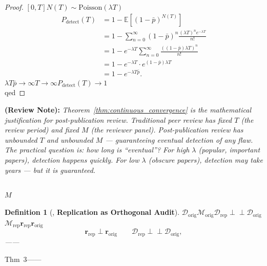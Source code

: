 \documentclass[12pt,a4paper]{article}
\newtheorem{definition}[theorem]{Definition}
\theoremstyle{remark}
\newcommand{\E}{\mathbb{E}}
\newcommand{\D}{\mathcal{D}}
\newcommand{\indep}{\perp\!\!\!\perp}
\newcommand{\reviewVec}{\mathbf{r}}
\newcommand{\detectProb}{P_{\text{detect}}}
\newcommand{\reviewnote}[1]{%
    \medskip\noindent
    \textbf{ (Review Note):} \textit{#1}%
}
\begin{document}
\begin{proof}
$[0, T]$$N(T) \sim \text{Poisson}(\lambda T)$
\begin{align}
    \detectProb(T) &= 1 - \E\left[(1-\bar{p})^{N(T)}\right] \\
    &= 1 - \sum_{n=0}^{\infty} (1-\bar{p})^n \frac{(\lambda T)^n e^{-\lambda T}}{n!} \\
    &= 1 - e^{-\lambda T} \sum_{n=0}^{\infty} \frac{((1-\bar{p})\lambda T)^n}{n!} \\
    &= 1 - e^{-\lambda T} \cdot e^{(1-\bar{p})\lambda T} \\
    &= 1 - e^{-\lambda T \bar{p}}.
\end{align}
$\lambda T \bar{p} \to \infty$$T \to \infty$$\detectProb(T) \to 1$\\qed
\end{proof}

\reviewnote{Theorem~\ref{thm:continuous_convergence} is the mathematical justification for post-publication review. Traditional peer review has fixed $T$ (the review period) and fixed $M$ (the reviewer panel). Post-publication review has unbounded $T$ and unbounded $M$ — guaranteeing eventual detection of any flaw. The practical question is: how long is ``eventual''? For high $\lambda$ (popular, important papers), detection happens quickly. For low $\lambda$ (obscure papers), detection may take years — but it is guaranteed.}

\subsection{}

$M$\textbf{}

\begin{definition}[, \textbf{Replication as Orthogonal Audit}]
\label{def:replication_orthogonal}
$\D_{\text{orig}}$$\mathcal{M}_{\text{orig}}$$\D_{\text{rep}} \indep \D_{\text{orig}}$$\mathcal{M}_{\text{rep}}$$\reviewVec_{\text{rep}}$$\reviewVec_{\text{orig}}$
\begin{equation}
    \reviewVec_{\text{rep}} \perp \reviewVec_{\text{orig}} \quad \text{} \quad \D_{\text{rep}} \indep \D_{\text{orig}},
    \label{eq:replication_orthogonal}
\end{equation}
——
\end{definition}

Thm~3——

\end{document}
